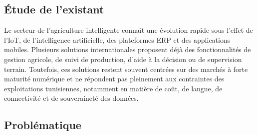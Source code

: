 \subsection{Étude de l'existant}

Le secteur de l'agriculture intelligente connaît une évolution rapide sous
l'effet de l'IoT, de l'intelligence artificielle, des plateformes ERP et des
applications mobiles. Plusieurs solutions internationales proposent déjà des
fonctionnalités de gestion agricole, de suivi de production, d'aide à la
décision ou de supervision terrain. Toutefois, ces solutions restent souvent
centrées sur des marchés à forte maturité numérique et ne répondent pas
pleinement aux contraintes des exploitations tunisiennes, notamment en matière
de coût, de langue, de connectivité et de souveraineté des données.

\begin{table}[H]
\centering
\caption{Comparaison des solutions d'agriculture intelligente existantes}
\label{tab:comparaison_existant}
\end{table}

\subsection{Problématique}

